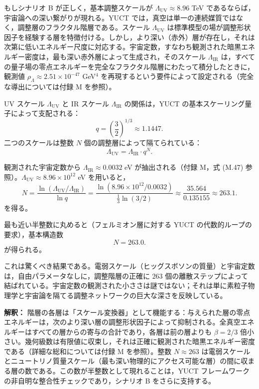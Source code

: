 \documentclass[11pt,a4paper]{article}
\newcommand{\LUV}{\Lambda_{\mathrm{UV}}}
\theoremstyle{remark}
\begin{document}
	もしシナリオ B が正しく，基本調整スケールが \(\LUV \approx 8.96\) TeV であるならば，宇宙論への深い繋がりが現れる。YUCT では，真空は単一の連続媒質ではなく，調整層のフラクタル階層である。スケール \(\LUV\) は標準模型の場が調整形状因子を経験する層を特徴付ける。しかし，より深い（赤外）層が存在し，それは次第に低いエネルギー尺度に対応する。宇宙定数，すなわち観測された暗黒エネルギー密度は，最も深い赤外層によって生成され，そのスケール \(\Lambda_{\mathrm{IR}}\) は，すべての量子場の零点エネルギーを完全なフラクタル階層にわたって積分したときに，観測値 \(\rho_{\Lambda} \approx 2.51 \times 10^{-47}\) GeV\(^4\) を再現するという要件によって設定される（完全な導出については付録 M を参照）。
	
	UV スケール \(\LUV\) と IR スケール \(\Lambda_{\mathrm{IR}}\) の関係は，YUCT の基本スケーリング量子によって支配される：
	\begin{equation}
		q = \left(\frac{3}{2}\right)^{1/3} \approx 1.1447.
	\end{equation}
	二つのスケールは整数 \(N\) 個の調整層によって隔てられている：
	\begin{equation}
		\LUV = \Lambda_{\mathrm{IR}} \cdot q^{N}.
		\label{eq:bridge}
	\end{equation}
	
	観測された宇宙定数から \(\Lambda_{\mathrm{IR}} \approx 0.0032\) eV が抽出される（付録 M，式 (M.47) 参照）。\(\LUV \approx 8.96 \times 10^{12}\) eV を用いると，
	\begin{equation}
		N = \frac{\ln(\LUV / \Lambda_{\mathrm{IR}})}{\ln q}
		= \frac{\ln(8.96 \times 10^{12} / 0.0032)}{\frac{1}{3}\ln(3/2)}
		\approx \frac{35.564}{0.135155} \approx 263.1.
		\label{eq:N_layers}
	\end{equation}
	を得る。
	
	最も近い半整数に丸めると（フェルミオン層に対する YUCT の代数的ループの要求），基本構造数
	\begin{equation}
		\boxed{N = 263.0}.
	\end{equation}
	が得られる。
	
	これは驚くべき結果である。電弱スケール（ヒッグスボソンの質量）と宇宙定数は，自由パラメータなしに，調整階層の正確に \(263\) 個の離散ステップによって結ばれている。宇宙定数の観測された小ささは謎ではない；それは単に素粒子物理学と宇宙論を隔てる調整ネットワークの巨大な深さを反映している。
	
	\textbf{解釈：} 階層の各層は「スケール変換器」として機能する：与えられた層の零点エネルギーは，次のより深い層の調整形状因子によって抑制される。全真空エネルギーはすべての層からの寄与の合計であり，各層は前の層よりも \(\beta = 2/3\) 倍小さい。幾何級数は有限値に収束し，それは正確に観測された暗黒エネルギー密度である（詳細な総和については付録 M を参照）。整数 \(N \approx 263\) は電弱スケールとニュートリノ質量スケール（最も深い物理的にアクセス可能な層）の間に収まる層の数である。この数が半整数として現れることは，YUCT フレームワークの非自明な整合性チェックであり，シナリオ B をさらに支持する。
	
\end{document}
